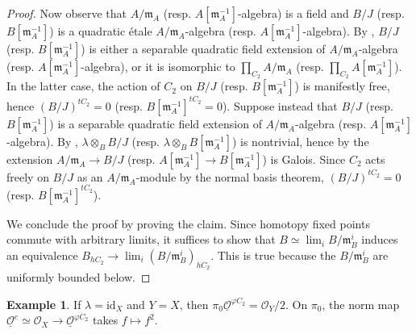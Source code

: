 \documentclass{article}
\theoremstyle{definition}
\newtheorem{example}[equation]{Example}
\newcommand{\Lucy}[1]{\todo[color=cyan!30]{\footnotesize L: #1}}
\begin{document}
\begin{proof}
    Now observe that $ A/\mathfrak{m}_A $ (resp. $ A[\mathfrak{m}_A^{-1}] $-algebra) is a field and $ B/J $ (resp. $ B[\mathfrak{m}_A^{-1}] $) is a quadratic étale $ A/\mathfrak{m}_A $-algebra (resp. $ A[\mathfrak{m}_A^{-1}] $-algebra). 
    By \cite[Proposition 3.4(ii)]{azumaya_involution}, $ B/J $ (resp. $ B[\mathfrak{m}_A^{-1}] $) is either a separable quadratic field extension of $ A/\mathfrak{m}_A $-algebra (resp. $ A[\mathfrak{m}_A^{-1}] $-algebra), or it is isomorphic to $ \prod_{C_2} A/\mathfrak{m}_A $ (resp. $ \prod_{C_2} A[\mathfrak{m}_A^{-1}] $). 
    In the latter case, the action of $ C_2 $ on $ B/J $ (resp. $ B[\mathfrak{m}_A^{-1}] $) is manifestly free, hence $ (B/J)^{tC_2} = 0 $ (resp. $ B[\mathfrak{m}_A^{-1}]^{tC_2} = 0 $). 
    Suppose instead that $ B/J $ (resp. $ B[\mathfrak{m}_A^{-1}] $) is a separable quadratic field extension of $ A/\mathfrak{m}_A $-algebra (resp. $ A[\mathfrak{m}_A^{-1}] $-algebra). 
    By \cite[Proposition 3.4(ii)]{azumaya_involution}, $ \lambda \otimes_{B} B/J $ (resp. $ \lambda \otimes_B B[\mathfrak{m}_A^{-1}] $) is nontrivial, hence by \cite[Lemma 9.21.2, Tag 09DU]{stacks} the extension $ A/\mathfrak{m}_A \to B/J $ (resp. $ A[\mathfrak{m}_A^{-1}] \to B[\mathfrak{m}_A^{-1}] $) is Galois. 
    Since $ C_2 $ acts freely on $ B/J $ as an $ A/\mathfrak{m}_A $-module by the normal basis theorem, $ (B/J)^{tC_2} = 0 $ (resp. $ B[\mathfrak{m}_A^{-1}]^{tC_2} $).

    We conclude the proof by proving the claim. 
    Since homotopy fixed points commute with arbitrary limits, it suffices to show that $ B \simeq \lim_i B/\mathfrak{m}_B^i $ induces an equivalence $ B_{hC_2} \to \lim_i \left(B/\mathfrak{m}_B^i\right)_{hC_2} $. 
    This is true because the $ B/\mathfrak{m}_B^i $ are uniformly bounded below. \Lucy{compare \cite[Remark 2.8]{MR4280864}.}      
\end{proof}  
\begin{example}
    If $ \lambda = \mathrm{id}_X $ and $ Y = X $, then $ \pi_0 \underline{\mathcal{O}}^{\varphi C_2} = \mathcal{O}_Y /2 $. 
    On $ \pi_0 $, the norm map $ \underline{\mathcal{O}}^e \simeq \mathcal{O}_X \to \underline{\mathcal{O}}^{\varphi C_2} $ takes $ f \mapsto f^2 $. 
\end{example}
\end{document}
